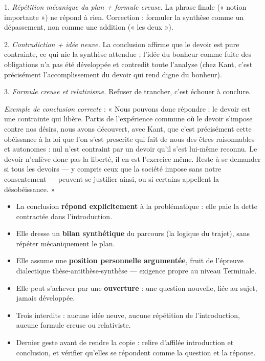 \documentclass[11pt]{article}
\begin{document}
\begin{corrige}
1. \emph{Répétition mécanique du plan + formule creuse.} La phrase finale (« notion importante ») ne répond à rien. Correction : formuler la synthèse comme un dépassement, non comme une addition (« les deux »).

2. \emph{Contradiction + idée neuve.} La conclusion affirme que le devoir est pure contrainte, ce qui nie la synthèse attendue ; l'idée du bonheur comme fuite des obligations n'a pas été développée et contredit toute l'analyse (chez Kant, c'est précisément l'accomplissement du devoir qui rend digne du bonheur).

3. \emph{Formule creuse et relativisme.} Refuser de trancher, c'est échouer à conclure.

\emph{Exemple de conclusion correcte} : « Nous pouvons donc répondre : le devoir est une contrainte qui libère. Partis de l'expérience commune où le devoir s'impose contre nos désirs, nous avons découvert, avec Kant, que c'est précisément cette obéissance à la loi que l'on s'est prescrite qui fait de nous des êtres raisonnables et autonomes : nul n'est contraint par un devoir qu'il s'est lui-même reconnu. Le devoir n'enlève donc pas la liberté, il en est l'exercice même. Reste à se demander si tous les devoirs — y compris ceux que la société impose sans notre consentement — peuvent se justifier ainsi, ou si certains appellent la désobéissance. »
\end{corrige}

\begin{aretenir}
\begin{itemize}
\item La conclusion \textbf{répond explicitement} à la problématique : elle paie la dette contractée dans l'introduction.
\item Elle dresse un \textbf{bilan synthétique} du parcours (la logique du trajet), sans répéter mécaniquement le plan.
\item Elle assume une \textbf{position personnelle argumentée}, fruit de l'épreuve dialectique thèse-antithèse-synthèse — exigence propre au niveau Terminale.
\item Elle peut s'achever par une \textbf{ouverture} : une question nouvelle, liée au sujet, jamais développée.
\item Trois interdits : aucune idée neuve, aucune répétition de l'introduction, aucune formule creuse ou relativiste.
\item Dernier geste avant de rendre la copie : relire d'affilée introduction et conclusion, et vérifier qu'elles se répondent comme la question et la réponse.
\end{itemize}
\end{aretenir}
\end{document}
